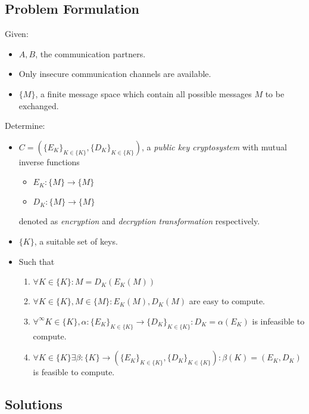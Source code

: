 \documentclass[paper=a4, fontsize=11pt]{scrartcl} %
\numberwithin{equation}{section} %
\numberwithin{figure}{section} %
\numberwithin{table}{section} %
\begin{document}
\subsection{Problem Formulation}
Given:
\begin{itemize}
	\item $A, B$, the communication partners.
	\item Only insecure communication channels are available.
	\item $\{M\}$, a finite message space which contain all possible messages $M$ to be exchanged.
\end{itemize}
Determine:
\begin{itemize}
	\item $C = (\{E_K\}_{K\in\{K\}}, \{D_K\}_{K\in\{K\}})$, a \textit{public key cryptosystem} with mutual inverse functions
	\begin{itemize}
		\item $E_K:\{M\}\rightarrow\{M\}$
		\item $D_K:\{M\}\rightarrow\{M\}$
	\end{itemize}
	denoted as \textit{encryption} and \textit{decryption transformation} respectively.
	\item $\{K\}$, a suitable set of keys.
	\item Such that
	\begin{enumerate}
	\item $\forall K\in\{K\}:M = D_K(E_K(M))$
	\item $\forall K\in\{K\},M\in\{M\}:E_K(M), D_K(M)$ are easy to compute.
	\item $\forall^\infty K\in\{K\},\alpha:\{E_K\}_{K\in\{K\}}\rightarrow \{D_K\}_{K\in\{K\}}:D_K = \alpha(E_K)$ is infeasible to compute.
	\item $\forall K\in\{K\}\exists\beta:\{K\}\rightarrow(\{E_K\}_{K\in\{K\}}, \{D_K\}_{K\in\{K\}}):\beta(K) = (E_K,D_K)$ is feasible to compute.
	\end{enumerate}
\end{itemize}

\subsection{Solutions}
\end{document}
